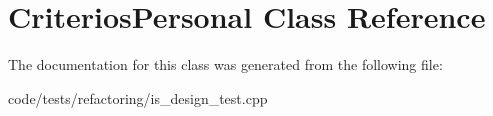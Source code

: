 \hypertarget{class_criterios_personal}{\section{Criterios\-Personal Class Reference}
\label{class_criterios_personal}
}


The documentation for this class was generated from the following file\-:\begin{DoxyCompactItemize}
\item 
code/tests/refactoring/is\-\_\-design\-\_\-test.\-cpp\end{DoxyCompactItemize}
